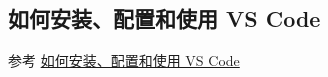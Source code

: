 
\subsection{如何安装、配置和使用 VS Code}   \label{subsec:VScode}

参考 \href{https://gitee.com/xkwxdyy/CCNUthesis/wikis/VScode%E7%9A%84%E5%AE%89%E8%A3%85%E9%85%8D%E7%BD%AE%E5%92%8C%E4%BD%BF%E7%94%A8}{如何安装、配置和使用 VS Code}